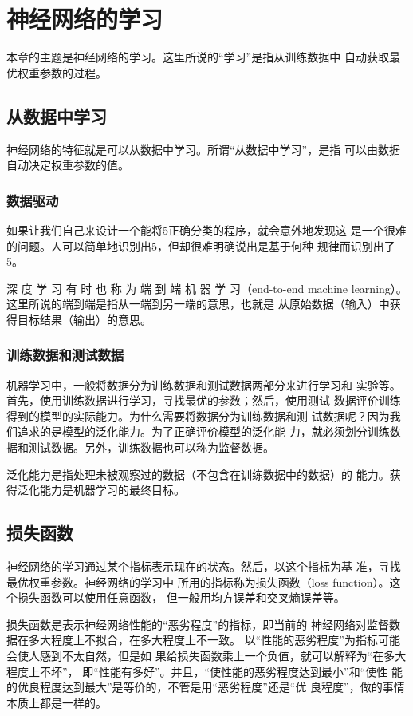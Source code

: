 \chapter{神经网络的学习}
本章的主题是神经网络的学习。这里所说的“学习”是指从训练数据中
自动获取最优权重参数的过程。
\section{从数据中学习}
神经网络的特征就是可以从数据中学习。所谓“从数据中学习”，是指
可以由数据自动决定权重参数的值。
\subsection{数据驱动}
如果让我们自己来设计一个能将5正确分类的程序，就会意外地发现这
是一个很难的问题。人可以简单地识别出5，但却很难明确说出是基于何种
规律而识别出了5。


\begin{tcolorbox}
    深 度 学 习 有 时 也 称 为 端 到 端 机 器 学 习（end-to-end machine
    learning）。这里所说的端到端是指从一端到另一端的意思，也就是
    从原始数据（输入）中获得目标结果（输出）的意思。
\end{tcolorbox}
\subsection{训练数据和测试数据}
机器学习中，一般将数据分为训练数据和测试数据两部分来进行学习和
实验等。首先，使用训练数据进行学习，寻找最优的参数；然后，使用测试
数据评价训练得到的模型的实际能力。为什么需要将数据分为训练数据和测
试数据呢？因为我们追求的是模型的泛化能力。为了正确评价模型的泛化能
力，就必须划分训练数据和测试数据。另外，训练数据也可以称为监督数据。

泛化能力是指处理未被观察过的数据（不包含在训练数据中的数据）的
能力。获得泛化能力是机器学习的最终目标。
\section{损失函数}
神经网络的学习通过某个指标表示现在的状态。然后，以这个指标为基
准，寻找最优权重参数。神经网络的学习中
所用的指标称为损失函数（loss function）。这个损失函数可以使用任意函数，
但一般用均方误差和交叉熵误差等。
\begin{tcolorbox}
    损失函数是表示神经网络性能的“恶劣程度”的指标，即当前的
    神经网络对监督数据在多大程度上不拟合，在多大程度上不一致。
    以“性能的恶劣程度”为指标可能会使人感到不太自然，但是如
    果给损失函数乘上一个负值，就可以解释为“在多大程度上不坏”，
    即“性能有多好”。并且，“使性能的恶劣程度达到最小”和“使性
    能的优良程度达到最大”是等价的，不管是用“恶劣程度”还是“优
    良程度”，做的事情本质上都是一样的。
\end{tcolorbox}
